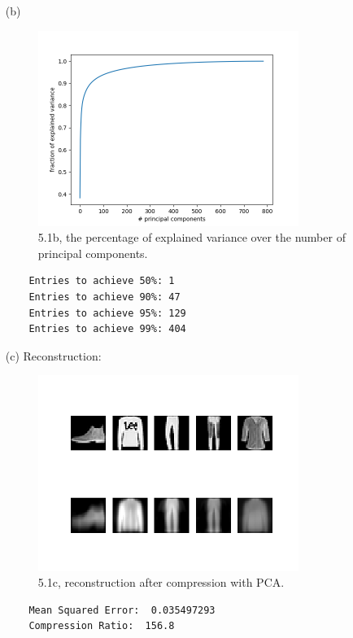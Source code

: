 \documentclass [a4paper, 11pt] {article}
\begin{document}
\begin{enumerate}
\newpage
\item[(b)]
\begin{figure}[!h]
	\centering
	\includegraphics[width=0.8\textwidth]{template/out/pca/cum_dist.png}
	\caption{ 5.1b, the percentage of explained variance over the number of principal components.}
\end{figure}
\begin{lstlisting}
	Entries to achieve 50%: 1
	Entries to achieve 90%: 47
	Entries to achieve 95%: 129
	Entries to achieve 99%: 404
\end{lstlisting}

\newpage
\item[(c)]
Reconstruction:\\
\begin{figure}[!h]
	\centering
	\includegraphics[width=0.8\textwidth]{template/out/pca/recon.png}
	\caption{ 5.1c, reconstruction after compression with PCA.}
\end{figure}

\begin{lstlisting}
	Mean Squared Error:  0.035497293
	Compression Ratio:  156.8
\end{lstlisting}


\end{enumerate}
\end{document}
